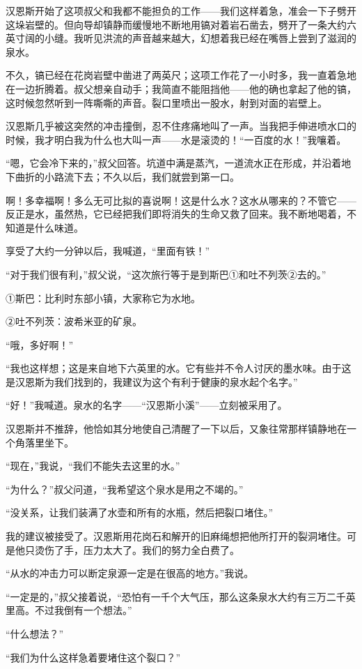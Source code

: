 \documentclass[10pt]{book}
\begin{document}
汉恩斯开始了这项叔父和我都不能担负的工作——我们这样着急，准会一下子劈开这垛岩壁的。但向导却镇静而缓慢地不断地用镐对着岩石凿去，劈开了一条大约六英寸阔的小缝。我听见洪流的声音越来越大，幻想着我已经在嘴唇上尝到了滋润的泉水。

不久，镐已经在花岗岩壁中凿进了两英尺；这项工作花了一小时多，我一直着急地在一边折腾着。叔父想亲自动手；我简直不能阻挡他——他的确也拿起了他的镐，这时候忽然听到一阵嘶嘶的声音。裂口里喷出一股水，射到对面的岩壁上。

汉恩斯几乎被这突然的冲击撞倒，忍不住疼痛地叫了一声。当我把手伸进喷水口的时候，我才明白我为什么也大叫一声——水是滚烫的！“一百度的水！”我嚷着。

“嗯，它会冷下来的，”叔父回答。坑道中满是蒸汽，一道流水正在形成，并沿着地下曲折的小路流下去；不久以后，我们就尝到第一口。

啊！多幸福啊！多么无可比拟的喜说啊！这是什么水？这水从哪来的？不管它——反正是水，虽然热，它已经把我们即将消失的生命又救了回来。我不断地喝着，不知道是什么味道。

享受了大约一分钟以后，我喊道，“里面有铁！”

“对于我们很有利，”叔父说，“这次旅行等于是到斯巴①和吐不列茨②去的。”

①斯巴：比利时东部小镇，大家称它为水地。

②吐不列茨：波希米亚的矿泉。

“哦，多好啊！”

“我也这样想；这是来自地下六英里的水。它有些并不令人讨厌的墨水味。由于这是汉恩斯为我们找到的，我建议为这个有利于健康的泉水起个名字。”

“好！”我喊道。泉水的名字——“汉恩斯小溪”——立刻被采用了。

汉恩斯并不推辞，他恰如其分地使自己清醒了一下以后，又象往常那样镇静地在一个角落里坐下。

“现在，”我说，“我们不能失去这里的水。”

“为什么？”叔父问道，“我希望这个泉水是用之不竭的。”

“没关系，让我们装满了水壶和所有的水瓶，然后把裂口堵住。”

我的建议被接受了。汉恩斯用花岗石和解开的旧麻绳想把他所打开的裂洞堵住。可是他只烫伤了手，压力太大了。我们的努力全白费了。

“从水的冲击力可以断定泉源一定是在很高的地方。”我说。

“一定是的，”叔父接着说，“恐怕有一千个大气压，那么这条泉水大约有三万二千英里高。不过我倒有一个想法。”

“什么想法？”

“我们为什么这样急着要堵住这个裂口？”
\end{document}
